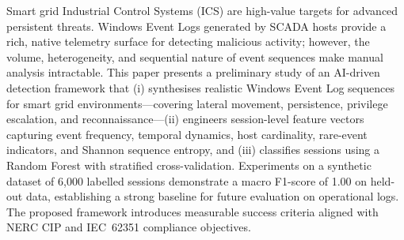Smart grid Industrial Control Systems (ICS) are high-value targets for advanced persistent
threats. Windows Event Logs generated by SCADA hosts provide a rich, native telemetry
surface for detecting malicious activity; however, the volume, heterogeneity, and sequential
nature of event sequences make manual analysis intractable. This paper presents a preliminary
study of an AI-driven detection framework that (i) synthesises realistic Windows Event Log
sequences for smart grid environments—covering lateral movement, persistence, privilege
escalation, and reconnaissance—(ii) engineers session-level feature vectors capturing event
frequency, temporal dynamics, host cardinality, rare-event indicators, and Shannon sequence
entropy, and (iii) classifies sessions using a Random Forest with stratified cross-validation.
Experiments on a synthetic dataset of 6{,}000 labelled sessions demonstrate a macro
F1-score of 1.00 on held-out data, establishing a strong baseline for future evaluation on
operational logs. The proposed framework introduces measurable success criteria aligned with
NERC CIP and IEC~62351 compliance objectives.
